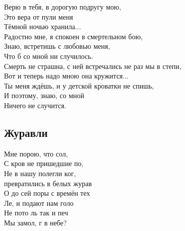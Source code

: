 \documentclass[fleqn,a5paper,12pt,twoside]{guitartabs}
\newcommand{\musSharp}{\texttt{\#}}
\newcommand{\musVspace}{\vspace{2mm}}
\begin{document}
    Верю в тебя, в дорогую подругу мою,\\
    Это вера от пули меня \\
    Тёмной ночью хранила...\\
    Радостно мне, я спокоен в смертельном бою,\\
    Знаю, встретишь с любовью меня, \\
    Что б со мной ни случилось.\musVspace\\
     \-\hspace{3mm}Смерть не страшна, с ней встречались не раз мы в степи,\\
     \-\hspace{3mm}Вот и теперь надо мною она кружится...\\
     \-\hspace{3mm}Ты меня ждёшь, и у детской кроватки не спишь,\\
     \-\hspace{3mm}И поэтому, знаю, со мной \\
     \-\hspace{3mm}Ничего не случится.
\newpage
{}%
\subsection*{Журавли}
    Мне  порою, что сол, \\
    С кров не пришедшие по,\\
    Не в  нашу полегли ког,\\ 
     превратились в белых журав\\
    О до сей поры с времён тех  \\
    Ле, и подают нам голо \\
    Не пото ль так  и печ \\
    Мы замол\CHORD{F\musSharp7}{каем}, г в небе?\\
\end{document}
